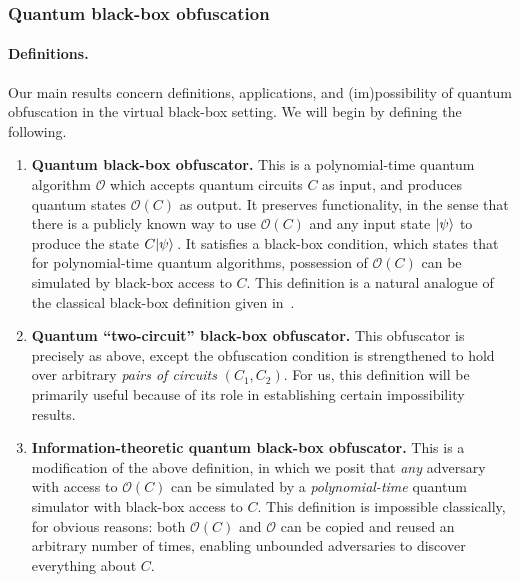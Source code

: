 \documentclass[envcountsame]{llncs}
\numberwithin{equation}{section}
\newcommand{\algo}{\mathcal}
\begin{document}
\subsubsection{Quantum black-box obfuscation}

\paragraph{Definitions.} Our main results concern definitions, applications, and (im)possibility of quantum obfuscation in the virtual black-box setting. We will begin by defining the following.

\begin{enumerate}
\item \textbf{Quantum black-box obfuscator.} This is a polynomial-time quantum algorithm $\algo O$ which accepts quantum circuits $C$ as input, and produces quantum states $\algo O(C)$ as output. It preserves functionality, in the sense that there is a publicly known way to use $\algo O(C)$ and any input state ${\left\vert{\psi}\right\rangle}$ to produce the state $C {\left\vert{\psi}\right\rangle}$\,. It satisfies a black-box condition, which states that for polynomial-time quantum algorithms, possession of $\algo O(C)$ can be simulated by black-box access to $C$. This definition is a natural analogue of the classical black-box definition given in~\cite{BGIRSVY12}.
\item \textbf{Quantum ``two-circuit'' black-box obfuscator.} This obfuscator is precisely as above, except the obfuscation condition is strengthened to hold over arbitrary \emph{pairs of circuits} $(C_1, C_2)$. For us, this definition will be primarily useful because of its role in establishing certain impossibility results.
\item \textbf{Information-theoretic quantum black-box obfuscator.} This is a modification of the above definition, in which we posit that \emph{any} adversary with access to $\algo O(C)$ can be simulated by a \emph{polynomial-time} quantum simulator with black-box access to $C$. This definition is impossible classically, for obvious reasons: both $\algo O(C)$  and $\algo O$ can be copied and reused an arbitrary number of times, enabling unbounded adversaries to discover everything about $C$.
\end{enumerate}
\end{document}

